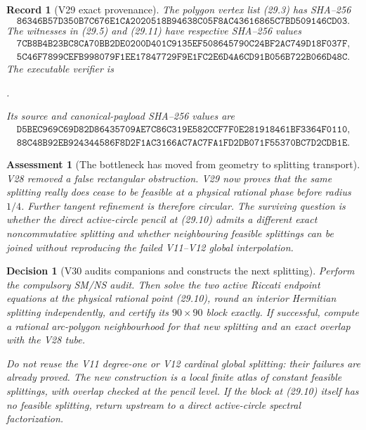 \documentclass[11pt,oneside]{article}
\newtheorem{assessment}[theorem]{Assessment}
\newtheorem{record}[theorem]{Record}
\newtheorem{decision}[theorem]{Decision}
\theoremstyle{definition}
\theoremstyle{remark}
\begin{document}
\begin{record}[V29 exact provenance]
\label{rec:newv29-provenance}
The polygon vertex list (29.3) has SHA--256
\[
\texttt{86346B57D350B7C676E1CA2020518B94638C05F8AC43616865C7BD509146CD03}.
                                                               \tag{29.12}
\]
The witnesses in (29.5) and (29.11) have respective SHA--256 values
\[
\begin{gathered}
\texttt{7CB8B4B23BC8CA70BB2DE0200D401C9135EF508645790C24BF2AC749D18F037F},\\
\texttt{5C46F7899CEFB998079F1EE17847729F9E1FC2E6D4A6CD91B056B722B066D48C}.
\end{gathered}                                          \tag{29.13}
\]
The executable verifier is
\begin{center}
\footnotesize
{}.
\end{center}
Its source and canonical-payload SHA--256 values are
\[
\begin{gathered}
\texttt{D5BEC969C69D82D86435709AE7C86C319E582CCF7F0E281918461BF3364F0110},\\
\texttt{88C48B92EB924344586F8D2F1AC3166AC7AC7FA1FD2DB071F55370BC7D2CDB1E}.
\end{gathered}                                          \tag{29.14}
\]
\end{record}

\begin{assessment}[The bottleneck has moved from geometry to splitting transport]
\label{ass:newv29}
V28 removed a false rectangular obstruction.  V29 now proves that
the same splitting really does cease to be feasible at a physical
rational phase before radius \(1/4\).  Further tangent refinement is
therefore circular.  The surviving question is whether the direct
active-circle pencil at (29.10) admits a different exact
noncommutative splitting and whether neighbouring feasible
splittings can be joined without reproducing the failed V11--V12
global interpolation.
\end{assessment}

\begin{decision}[V30 audits companions and constructs the next splitting]
\label{dec:newv29-next}
Perform the compulsory SM/NS audit.  Then solve the two active
Riccati endpoint equations at the physical rational point (29.10),
round an interior Hermitian splitting independently, and certify its
\(90\times90\) block exactly.  If successful, compute a rational
arc-polygon neighbourhood for that new splitting and an exact
overlap with the V28 tube.

Do not reuse the V11 degree-one or V12 cardinal global splitting:
their failures are already proved.  The new construction is a local
finite atlas of constant feasible splittings, with overlap checked
at the pencil level.  If the block at (29.10) itself has no feasible
splitting, return upstream to a direct active-circle spectral
factorization.
\end{decision}
\end{document}

